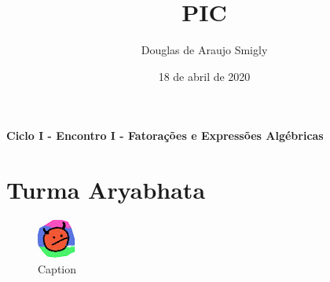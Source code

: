 \documentclass[12pt, a4paper]{article}
\title{PIC}
\author{Douglas de Araujo Smigly}
\date{18 de abril de 2020}
\begin{document}
\maketitle
\begin{center}
\large\textbf{\textcolor{Floresta}{Ciclo I - Encontro I - Fatorações e Expressões Algébricas}}\\
\end{center}
\section{Turma Aryabhata}
\begin{figure}[!h]
    \centering
    \includegraphics{lgogo.jpg}
    \caption{Caption}
    \label{fig:my_label}
\end{figure}
\end{document}
